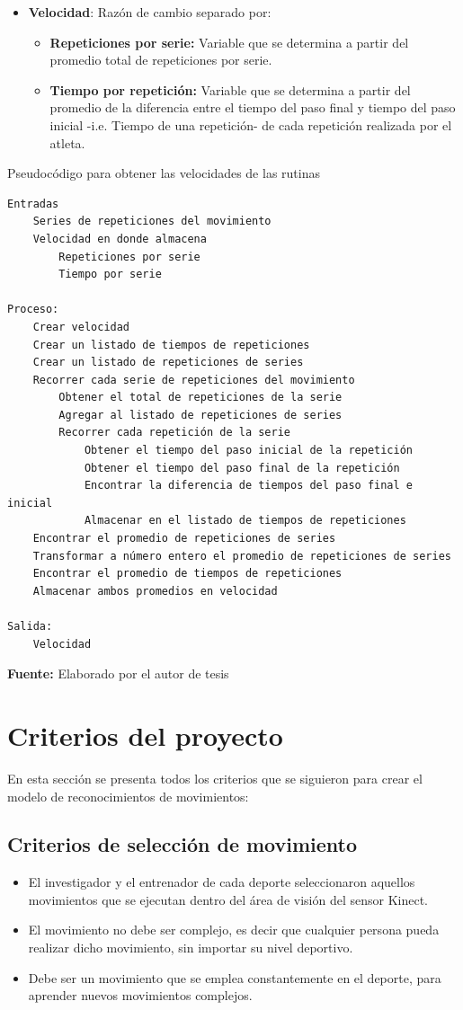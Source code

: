 \begin{itemize}
\item \textbf{Velocidad}: Raz\'on de cambio separado por:
	\begin{itemize}
	\item \textbf{Repeticiones por serie:} Variable que se determina a partir del promedio total de repeticiones por serie.
		\item \textbf{Tiempo por repetici\'on:} Variable que se determina a partir del promedio de la diferencia entre el tiempo del paso final y tiempo del paso inicial -i.e. Tiempo de una repetici\'on- de cada repetici\'on realizada por el atleta.
	\end{itemize}
\end{itemize}


\begin{code}[H]
	\caption{Pseudoc\'odigo para obtener las velocidades de las rutinas}
	\label{code:getTimeOfRepetitions}
	\begin{lstlisting}
Entradas
	Series de repeticiones del movimiento
	Velocidad en donde almacena
		Repeticiones por serie
		Tiempo por serie
		
Proceso:
	Crear velocidad
	Crear un listado de tiempos de repeticiones
	Crear un listado de repeticiones de series
	Recorrer cada serie de repeticiones del movimiento
		Obtener el total de repeticiones de la serie
		Agregar al listado de repeticiones de series
		Recorrer cada repetición de la serie
			Obtener el tiempo del paso inicial de la repetición
			Obtener el tiempo del paso final de la repetición
			Encontrar la diferencia de tiempos del paso final e inicial
			Almacenar en el listado de tiempos de repeticiones
	Encontrar el promedio de repeticiones de series
	Transformar a número entero el promedio de repeticiones de series
	Encontrar el promedio de tiempos de repeticiones
	Almacenar ambos promedios en velocidad
	
Salida:
	Velocidad
	\end{lstlisting}
	\textbf{Fuente:} Elaborado por el autor de tesis
\end{code} 
\section{Criterios del proyecto}\label{criter}
En esta secci\'on se presenta todos los criterios que se siguieron para crear el modelo de reconocimientos de movimientos:
\subsection{Criterios de selecci\'on de movimiento}
\begin{itemize}
	\item El investigador y el entrenador de cada deporte  seleccionaron aquellos movimientos que se ejecutan dentro del \'area de visi\'on del sensor Kinect.
	\item El movimiento no debe ser complejo, es decir que cualquier persona pueda realizar dicho movimiento, sin importar su nivel deportivo.
	\item Debe ser un movimiento que se emplea constantemente en el deporte, para aprender nuevos movimientos complejos.
\end{itemize}
